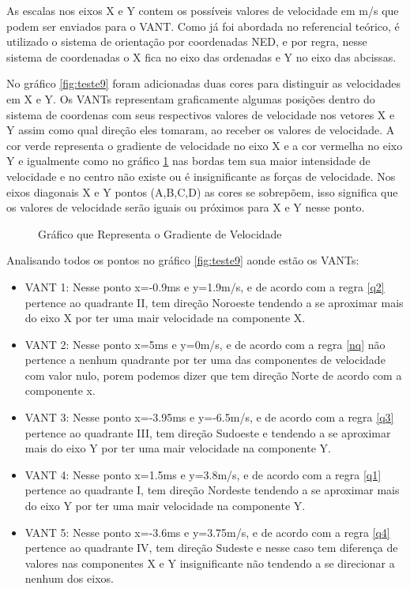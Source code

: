 As escalas nos eixos X e Y contem os possíveis valores de velocidade em m/s que podem ser enviados para o VANT. Como já foi abordada no referencial teórico, é utilizado o sistema de orientação por coordenadas NED, e por regra, nesse sistema de coordenadas o X fica no eixo das ordenadas e Y no eixo das abcissas.

No gráfico \ref{fig:teste9} foram adicionadas duas cores para distinguir as velocidades em X e Y. Os VANTs representam graficamente algumas posições dentro do sistema de coordenas com seus respectivos valores de velocidade nos vetores X e Y assim como qual direção eles tomaram, ao receber os valores de velocidade. A cor verde representa o gradiente de velocidade no eixo X e a cor vermelha no eixo Y e igualmente como no gráfico \ref{fig:teste8} nas bordas tem sua maior intensidade de velocidade e no centro não existe ou é insignificante as forças de velocidade. Nos eixos diagonais X e Y pontos (A,B,C,D) as cores se sobrepõem, isso significa que os valores de velocidade serão iguais ou próximos para X e Y nesse ponto.

\begin{figure}[H]
	\centering
	\caption{Gráfico que Representa o Gradiente de Velocidade}
	
	\label{fig:teste8}
\end{figure}

Analisando todos os pontos no gráfico \ref{fig:teste9} aonde estão os VANTs:

\begin{itemize}
	\item VANT 1: Nesse ponto x=-0.9ms e y=1.9m/s, e de acordo com a regra \ref{q2} pertence ao quadrante II, tem direção Noroeste tendendo a se aproximar mais do eixo X por ter uma mair velocidade na componente X.
	\item VANT 2: Nesse ponto x=5ms e y=0m/s, e de acordo com a regra \ref{nq} não pertence a nenhum quadrante por ter uma das componentes de velocidade com valor nulo, porem podemos dizer que tem direção Norte de acordo com a componente x.
	\item VANT 3: Nesse ponto x=-3.95ms e y=-6.5m/s, e de acordo com a regra \ref{q3} pertence ao quadrante III, tem direção Sudoeste e tendendo a se aproximar mais do eixo Y por ter uma mair velocidade na componente Y.
	\item VANT 4: Nesse ponto x=1.5ms e y=3.8m/s, e de acordo com a regra \ref{q1} pertence ao quadrante I, tem direção Nordeste tendendo a se aproximar mais do eixo Y por ter uma mair velocidade na componente Y.
	\item VANT 5: Nesse ponto x=-3.6ms e y=3.75m/s, e de acordo com a regra \ref{q4} pertence ao quadrante IV, tem direção Sudeste e nesse caso tem diferença de valores nas componentes X e Y insignificante não tendendo a se direcionar a nenhum dos eixos.
\end{itemize}

